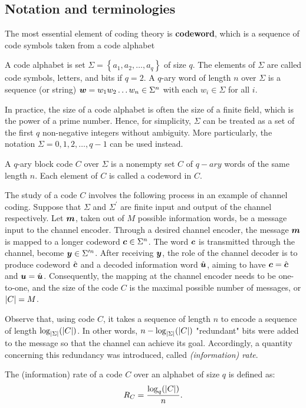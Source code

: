 \subsection{Notation and terminologies}\label{subsec:nota_term}
The most essential element of coding theory is \textbf{codeword}, which is a sequence of code symbols taken from a code alphabet
\begin{definition}
    A code alphabet is set $\Sigma=\left\{a_{1},a_{2},\ldots,a_{q}\right\}$ of size $q$. The elements of $\Sigma$ are called code symbols, letters, and bits if $q=2$. A $q$-ary word of length $n$ over $\Sigma$ is a sequence (or string) ${\boldsymbol w}=w_{1}w_{2}\ldots w_{n}\in\Sigma^{n}$ with each $w_{i}\in\Sigma$ for all $i$. 
\end{definition}
In practice, the size of a code alphabet is often the size of a finite field, which is the power of a prime number. Hence, for simplicity, $\Sigma$ can be treated as a set of the first $q$ non-negative integers without ambiguity. More particularly, the notation $\Sigma={0,1,2,\ldots,q-1}$ can be used instead.
\begin{definition}
    A $q$-ary block code $C$ over $\Sigma$ is a nonempty set $C$ of $q-ary$ words of the same length $n$. Each element of $C$ is called a codeword in $C$.
\end{definition}
The study of a code $C$ involves the following process in an example of channel coding. Suppose that $\Sigma$ and $\Sigma^{\prime}$ are finite input and output of the channel respectively. Let ${\boldsymbol m}$, taken out of $M$ possible information words, be a message input to the channel encoder. Through a desired channel encoder, the message ${\boldsymbol m}$ is mapped to a longer codeword ${\boldsymbol c}\in\Sigma^{n}$. The word ${\boldsymbol c}$ is transmitted through the channel, become ${\boldsymbol y}\in\Sigma^{\prime n}$. After receiving ${\boldsymbol y}$, the role of the channel decoder is to produce codeword $\hat{{\boldsymbol c}}$ and a decoded information word $\hat{{\boldsymbol u}}$, aiming to have ${\boldsymbol c}=\hat{{\boldsymbol c}}$ and ${\boldsymbol u}=\hat{{\boldsymbol u}}$. Consequently, the mapping at the channel encoder needs to be one-to-one, and the size of the code $C$ is the maximal possible number of messages, or $\left \lvert C \right \rvert=M$.

Observe that, using code $C$, it takes a sequence of length $n$ to encode a sequence of length $\log_{\left \lvert \Sigma \right \rvert}(\left \lvert C \right \rvert)$. In other words, $n-\log_{\left \lvert \Sigma \right \rvert}(\left \lvert C \right \rvert)$ "redundant" bits were added to the message so that the channel can achieve its goal. Accordingly, a quantity concerning this redundancy was introduced, called \textit{(information) rate}. 
\begin{definition}\label{def:information_rate}
    The (information) rate of a code $C$ over an alphabet of size $q$ is defined as:
    \begin{align}
        R_{C}= \dfrac{\log_{q}(\left \lvert C \right \rvert)}{n}.
    \end{align}
\end{definition}

